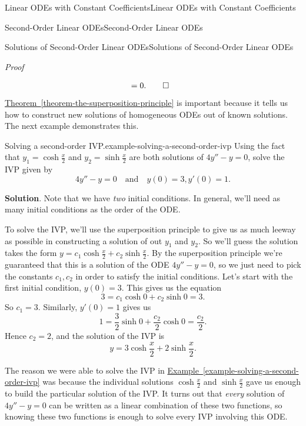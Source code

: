 \documentclass[10pt,]{book}
\makeatletter
\renewcommand*{\proofname}{Proof}
\renewenvironment{proof}[1][\proofname]{\par
  \pushQED{\qed}%
  \normalfont \topsep6\p@\@plus6\p@\relax
  \trivlist
  \item\relax
    {\itshape
    #1\@addpunct{.}}\hspace\labelsep\ignorespaces
}{%
  \popQED\endtrivlist\@endpefalse
}
\numberwithin{equation}{section}
\newcommand{\amp}{&}
\makeatother
\begin{document}
\begin{chapterptx}{Linear ODEs with Constant Coefficients}{}{Linear ODEs with Constant Coefficients}{}{}
\begin{sectionptx}{Second-Order Linear ODEs}{}{Second-Order Linear ODEs}{}{}
\begin{subsectionptx}{Solutions of Second-Order Linear ODEs}{}{Solutions of Second-Order Linear ODEs}{}{}
\begin{proof}
\begin{align*}
\amp = 0. \qedhere
\end{align*}
%
\end{proof}
\hypertarget{p-158}{}%
\hyperref[theorem-the-superposition-principle]{Theorem~\ref{theorem-the-superposition-principle}} is important because it tells us how to construct new solutions of homogeneous ODEs out of known solutions. The next example demonstrates this.%
\begin{example}{Solving a second-order IVP.}{example-solving-a-second-order-ivp}%
\hypertarget{p-159}{}%
Using the fact that \(y_{1} = \cosh\frac{x}{2}\) and \(y_{2} = \sinh\frac{x}{2}\) are both solutions of \(4y''-y = 0\), solve the IVP given by%
\begin{equation*}
4y''-y=0\quad\text{and}\quad y(0)=3,y'(0)=1.
\end{equation*}
%
\par\smallskip%
\noindent\textbf{Solution}.\hypertarget{solution-25}{}\quad%
\hypertarget{p-160}{}%
Note that we have \emph{two} initial conditions. In general, we'll need as many initial conditions as the order of the ODE.%
\par
\hypertarget{p-161}{}%
To solve the IVP, we'll use the superposition principle to give us as much leeway as possible in constructing a solution of out \(y_{1}\) and \(y_{2}\). So we'll guess the solution takes the form \(y = c_{1}\cosh\frac{x}{2} + c_{2}\sinh\frac{x}{2}\). By the superposition principle we're guaranteed that this is a solution of the ODE \(4y''-y=0\), so we just need to pick the constants \(c_{1},c_{2}\) in order to satisfy the initial conditions. Let's start with the first initial condition, \(y(0) = 3\). This gives us the equation%
\begin{equation*}
3 = c_{1}\cosh0+c_{2}\sinh0 = 3.
\end{equation*}
So \(c_{1} = 3\). Similarly, \(y'(0) = 1\) gives us%
\begin{equation*}
1 = \frac{3}{2}\sinh0+\frac{c_{2}}{2}\cosh0 = \frac{c_{2}}{2}.
\end{equation*}
Hence \(c_{2} = 2\), and the solution of the IVP is%
\begin{equation*}
y = 3\cosh\frac{x}{2} + 2\sinh\frac{x}{2}.
\end{equation*}
%
\end{example}
\hypertarget{p-162}{}%
The reason we were able to solve the IVP in \hyperref[example-solving-a-second-order-ivp]{Example~\ref{example-solving-a-second-order-ivp}} was because the individual solutions \(\cosh\frac{x}{2}\) and \(\sinh\frac{x}{2}\) gave us enough to build the particular solution of the IVP. It turns out that \emph{every} solution of \(4y''-y=0\) can be written as a linear combination of these two functions, so knowing these two functions is enough to solve every IVP involving this ODE.%

\end{subsectionptx}
\end{sectionptx}
\end{chapterptx}
\end{document}
